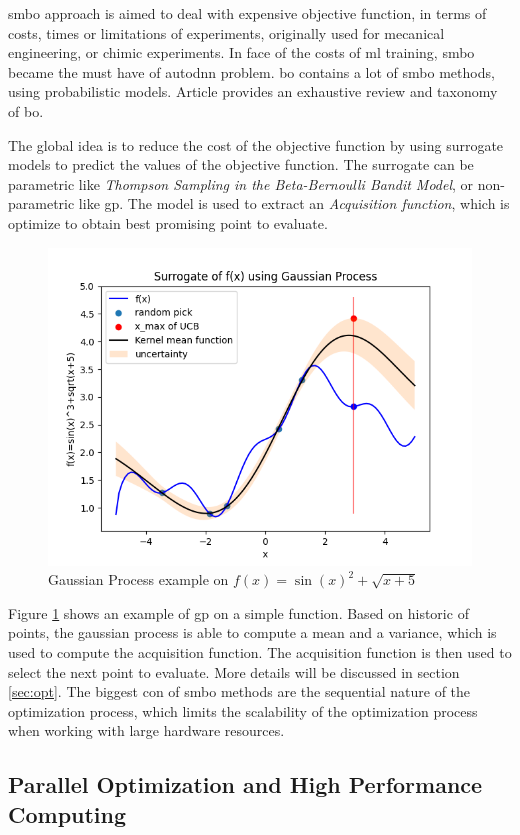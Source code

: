 \acrfull{smbo} approach is aimed to deal with expensive objective function, in terms of costs, times or limitations of experiments, originally used for mecanical engineering, or chimic experiments. In face of the costs of \acrshort{ml} training, \acrshort{smbo} became the must have of \acrshort{autodnn} problem. \acrfull{bo} contains a lot of \acrshort{smbo} methods, using probabilistic models. Article \cite{shahriari_taking_2016} provides an exhaustive review and taxonomy of \acrshort{bo}.

The global idea is to reduce the cost of the objective function by using surrogate models to predict the values of the objective function. The surrogate can be parametric like \textit{Thompson Sampling in the Beta-Bernoulli Bandit Model}, or non-parametric like \acrfull{gp}. The model is used to extract an \textit{Acquisition function}, which is optimize to obtain best promising point to evaluate.

\begin{figure}[h]
    \centering
    \includegraphics[width=0.5\linewidth]{assets/img/chap_2/plots/gaussian_process.png}
    \caption{Gaussian Process example on $f(x)=\sin(x)^2+\sqrt{x+5}$}
    \label{fig:gp_eg}
\end{figure}

Figure \ref{fig:gp_eg} shows an example of \acrfull{gp} on a simple function. Based on historic of points, the gaussian process is able to compute a mean and a variance, which is used to compute the acquisition function. The acquisition function is then used to select the next point to evaluate. More details will be discussed in section \ref{sec:opt}. The biggest con of \acrshort{smbo} methods are the sequential nature of the optimization process, which limits the scalability of the optimization process when working with large hardware resources.

\subsection{Parallel Optimization and High Performance Computing}

